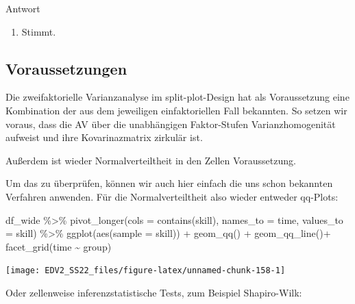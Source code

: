 \documentclass[
]{book}
\newenvironment{Shaded}{\begin{snugshade}}{\end{snugshade}}
\newcommand{\AttributeTok}[1]{\textcolor[rgb]{0.77,0.63,0.00}{#1}}
\newcommand{\FunctionTok}[1]{\textcolor[rgb]{0.00,0.00,0.00}{#1}}
\newcommand{\NormalTok}[1]{#1}
\newcommand{\SpecialCharTok}[1]{\textcolor[rgb]{0.00,0.00,0.00}{#1}}
\newcommand{\StringTok}[1]{\textcolor[rgb]{0.31,0.60,0.02}{#1}}
\providecommand{\tightlist}{%
  \setlength{\itemsep}{0pt}\setlength{\parskip}{0pt}}
\begin{document}
Antwort

\begin{enumerate}
\def\labelenumi{\arabic{enumi}.}
\tightlist
\item
  Stimmt.
\end{enumerate}

\hypertarget{voraussetzungen-2}{%
\subsection{Voraussetzungen}\label{voraussetzungen-2}}

Die zweifaktorielle Varianzanalyse im split-plot-Design hat als Voraussetzung eine Kombination der aus dem jeweiligen einfaktoriellen Fall bekannten. So setzen wir voraus, dass die AV über die unabhängigen Faktor-Stufen Varianzhomogenität aufweist und ihre Kovarinazmatrix zirkulär ist.

Außerdem ist wieder Normalverteiltheit in den Zellen Voraussetzung.

Um das zu überprüfen, können wir auch hier einfach die uns schon bekannten Verfahren anwenden. Für die Normalverteiltheit also wieder entweder qq-Plots:

\begin{Shaded}
\begin{Highlighting}[]
\NormalTok{df\_wide }\SpecialCharTok{\%\textgreater{}\%} 
  \FunctionTok{pivot\_longer}\NormalTok{(}\AttributeTok{cols =} \FunctionTok{contains}\NormalTok{(}\StringTok{\textquotesingle{}skill\textquotesingle{}}\NormalTok{),}
               \AttributeTok{names\_to =} \StringTok{\textquotesingle{}time\textquotesingle{}}\NormalTok{,}
               \AttributeTok{values\_to =} \StringTok{\textquotesingle{}skill\textquotesingle{}}\NormalTok{) }\SpecialCharTok{\%\textgreater{}\%} 
  \FunctionTok{ggplot}\NormalTok{(}\FunctionTok{aes}\NormalTok{(}\AttributeTok{sample =}\NormalTok{ skill)) }\SpecialCharTok{+}
  \FunctionTok{geom\_qq}\NormalTok{() }\SpecialCharTok{+}
  \FunctionTok{geom\_qq\_line}\NormalTok{()}\SpecialCharTok{+}
  \FunctionTok{facet\_grid}\NormalTok{(time }\SpecialCharTok{\textasciitilde{}}\NormalTok{ group) }
\end{Highlighting}
\end{Shaded}

\begin{center}\texttt{[image: EDV2\_SS22\_files/figure-latex/unnamed-chunk-158-1]} \end{center}

Oder zellenweise inferenzstatistische Tests, zum Beispiel Shapiro-Wilk:
\end{document}
